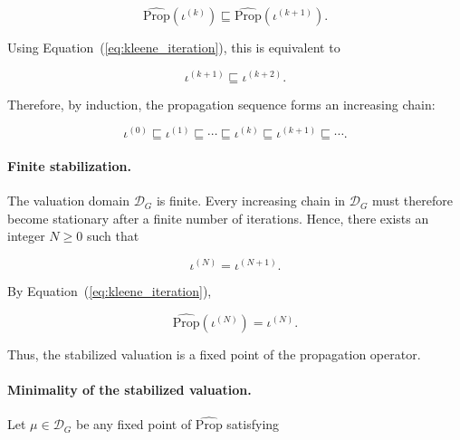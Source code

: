 \documentclass[10pt]{article}
\begin{document}
\begin{equation}
	\widehat{\mathrm{Prop}}
	\!\left(
	\iota^{(k)}
	\right)
	\sqsubseteq
	\widehat{\mathrm{Prop}}
	\!\left(
	\iota^{(k+1)}
	\right).
	\label{eq:iteration_monotone_step}
\end{equation}

Using Equation~(\ref{eq:kleene_iteration}), this is equivalent to

\begin{equation}
	\iota^{(k+1)}
	\sqsubseteq
	\iota^{(k+2)}.
	\label{eq:iteration_induction_step}
\end{equation}

Therefore, by induction, the propagation sequence forms an increasing chain:

\begin{equation}
	\iota^{(0)}
	\sqsubseteq
	\iota^{(1)}
	\sqsubseteq
	\cdots
	\sqsubseteq
	\iota^{(k)}
	\sqsubseteq
	\iota^{(k+1)}
	\sqsubseteq
	\cdots.
	\label{eq:increasing_chain}
\end{equation}

\paragraph{Finite stabilization.}

The valuation domain $\mathcal D_G$ is finite. Every increasing chain in
$\mathcal D_G$ must therefore become stationary after a finite number of
iterations. Hence, there exists an integer $N\geq 0$ such that

\begin{equation}
	\iota^{(N)}
	=
	\iota^{(N+1)}.
	\label{eq:stabilization}
\end{equation}

By Equation~(\ref{eq:kleene_iteration}),

\begin{equation}
	\widehat{\mathrm{Prop}}
	\!\left(
	\iota^{(N)}
	\right)
	=
	\iota^{(N)}.
	\label{eq:iteration_fixed_point}
\end{equation}

Thus, the stabilized valuation is a fixed point of the propagation operator.

\paragraph{Minimality of the stabilized valuation.}

Let $\mu\in\mathcal D_G$ be any fixed point of
$\widehat{\mathrm{Prop}}$ satisfying
\end{document}
